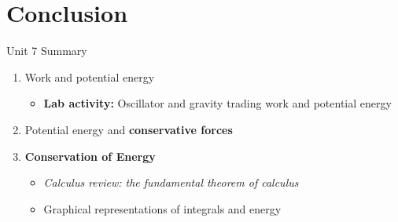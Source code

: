 \documentclass{beamer}
\begin{document}
\section{Conclusion}

\begin{frame}{Unit 7 Summary}
\begin{enumerate}
\item \alert{Work} and \alert{potential energy}
\begin{itemize}
\item \textbf{Lab activity:} Oscillator and gravity trading work and potential energy
\end{itemize}
\item Potential energy and \textbf{conservative forces}
\item \alert{\textbf{Conservation of Energy}}
\begin{itemize}
\item \textit{Calculus review: the fundamental theorem of calculus}
\item Graphical representations of integrals and energy
\end{itemize}
\end{enumerate}
\end{frame}
\end{document}
